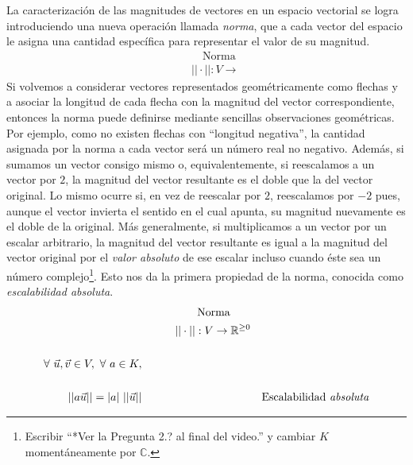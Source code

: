 \documentclass[12pt,dvipsnames]{article}
\numberwithin{equation}{section}
\begin{document}
La caracterización de las magnitudes de vectores en un espacio vectorial se logra introduciendo una nueva operación llamada \emph{norma}, que a cada vector del espacio le asigna una cantidad específica para representar el valor de su magnitud. 
\begin{align*}
     & & &\quad \text{Norma}& \\
     & & &||\cdot||:V\to &
\end{align*}
Si volvemos a considerar vectores representados geométricamente como flechas y a asociar la longitud de cada flecha con la magnitud del vector correspondiente, entonces la norma puede definirse mediante sencillas observaciones geométricas. Por ejemplo, como no existen flechas con ``longitud negativa'', la cantidad asignada por la norma a cada vector será un número real no negativo. Además, si sumamos un vector consigo mismo \textemdash o, equivalentemente, si reescalamos a un vector por $2$\textemdash, la magnitud del vector resultante es el doble que la del vector original. Lo mismo ocurre si, en vez de reescalar por $2$, reescalamos por $-2$ pues, aunque el vector invierta el sentido en el cual apunta, su magnitud nuevamente es el doble de la original. Más generalmente, si multiplicamos a un vector por un escalar arbitrario, la magnitud del vector resultante es igual a la magnitud del vector original por el \emph{valor absoluto} de ese escalar \textemdash incluso cuando éste sea un número complejo\footnote{Escribir ``*Ver la Pregunta 2.? al final del video.'' y cambiar $K$ momentáneamente por $\mathbb{C}$.}. Esto nos da la primera propiedad de la norma, conocida como \emph{escalabilidad absoluta}. %
\begin{align*}
     &\quad \quad \quad \quad \quad \text{Norma}& \\
     &\quad \quad \quad ||\cdot||:V\to \mathbb{R}^{\ge0}& \\
     \\
     \forall \ \vec{u},\vec{v}\in V, \ \forall \ a\in K, \\
    \\
    ||a\vec{u}|| = |a| \ ||\vec{u}|| &&\text{Escalabilidad \emph{absoluta}} \\
\end{align*}
\end{document}
